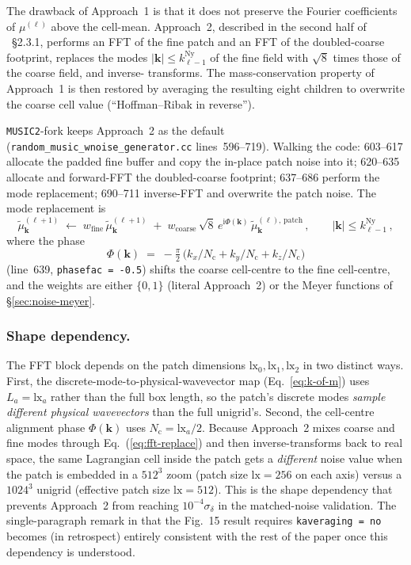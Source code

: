 \documentclass[12pt]{article}
\newcommand{\bk}{\mathbf{k}}
\newcommand{\code}[1]{\texttt{#1}}
\begin{document}
The drawback of Approach~1 is that it does not preserve the Fourier
coefficients of $\mu^{(\ell)}$ above the cell-mean.  Approach~2,
described in the second half of \citet{Hahn2011}~\S2.3.1, performs an
FFT of the fine patch and an FFT of the doubled-coarse footprint,
replaces the modes $|\bk| \le k^\mathrm{Ny}_{\ell-1}$ of the fine
field with $\sqrt{8}$ times those of the coarse field, and inverse-
transforms.  The mass-conservation property of Approach~1 is then
restored by averaging the resulting eight children to overwrite the
coarse cell value (``Hoffman--Ribak in reverse'').

\texttt{MUSIC2}-fork keeps Approach~2 as the default
(\code{random\_music\_wnoise\_generator.cc} lines~596--719).
Walking the code: 603--617 allocate the padded fine buffer and copy
the in-place patch noise into it; 620--635 allocate and forward-FFT
the doubled-coarse footprint; 637--686 perform the mode replacement;
690--711 inverse-FFT and overwrite the patch noise.  The mode
replacement is
\begin{equation}
  \tilde\mu^{(\ell+1)}_\bk \;\leftarrow\;
       w_\mathrm{fine}\,\tilde\mu^{(\ell+1)}_\bk\;
       +\;w_\mathrm{coarse}\,\sqrt{8}\,e^{\mathrm{i}\Phi(\bk)}\,
        \tilde\mu^{(\ell),\,\mathrm{patch}}_\bk\,,
  \qquad |\bk| \le k^\mathrm{Ny}_{\ell-1}\,,
  \label{eq:fft-replace}
\end{equation}
where the phase
\begin{equation}
\Phi(\bk) \;=\; -\tfrac{\pi}{2}\,\bigl(k_x / N_\mathrm{c}
            + k_y / N_\mathrm{c} + k_z / N_\mathrm{c}\bigr)
\label{eq:phase-shift}
\end{equation}
(line~639, \code{phasefac = -0.5}) shifts the coarse cell-centre to
the fine cell-centre, and the weights are either $\{0, 1\}$
(literal Approach~2) or the Meyer functions of
\S\ref{sec:noise-meyer}.

\subsubsection{Shape dependency.}
\label{sec:noise-approach-shape-dep}
The FFT block depends on the patch dimensions
$\mathrm{lx}_0, \mathrm{lx}_1, \mathrm{lx}_2$ in two distinct ways.
First, the discrete-mode-to-physical-wavevector map
(Eq.~\ref{eq:k-of-m}) uses $L_a = \mathrm{lx}_a$ rather than the
full box length, so the patch's discrete modes \emph{sample
different physical wavevectors} than the full unigrid's.  Second,
the cell-centre alignment phase $\Phi(\bk)$ uses
$N_\mathrm{c} = \mathrm{lx}_a / 2$.  Because Approach~2 mixes
coarse and fine modes through Eq.~(\ref{eq:fft-replace}) and then
inverse-transforms back to real space, the same Lagrangian cell
inside the patch gets a \emph{different} noise value when the patch
is embedded in a $512^3$ zoom (patch size $\mathrm{lx} = 256$ on
each axis) versus a $1024^3$ unigrid (effective patch size
$\mathrm{lx} = 512$).  This is the shape dependency that prevents
Approach~2 from reaching $10^{-4}\sigma_\delta$ in the matched-noise
validation.  The single-paragraph remark in \citet{Hahn2011} that
the Fig.~15 result requires \code{kaveraging = no} becomes (in
retrospect) entirely consistent with the rest of the paper once
this dependency is understood.
\end{document}
